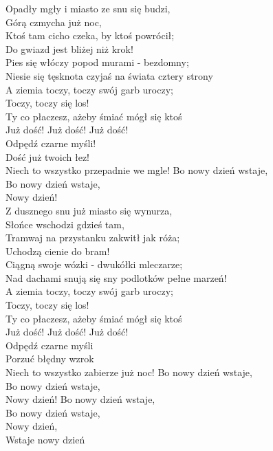 
Opadły mgły i miasto ze snu się budzi, \\
Górą czmycha już noc, \tab{} \\
Ktoś tam cicho czeka, by ktoś powrócił; \\
Do gwiazd jest bliżej niż krok! \\
Pies się włóczy popod murami - bezdomny; \\
Niesie się tęsknota czyjaś na świata cztery strony \\
\hops
{} A ziemia toczy, toczy swój garb uroczy; \\
 Toczy, toczy się los! \\
 Ty co płaczesz, ażeby śmiać mógł się ktoś \\
 Już dość! Już dość! Już dość! \\
 Odpędź czarne myśli! \\
 Dość już twoich łez! \\
 Niech to wszystko przepadnie we mgle! 
\hop
{} {} Bo nowy dzień wstaje, \\
 {} Bo nowy dzień wstaje, \\
 {} Nowy dzień! \\
\hops
Z dusznego snu już miasto się wynurza, \\
Słońce wschodzi gdzieś tam, \\
Tramwaj na przystanku zakwitł jak róża; \\
Uchodzą cienie do bram! \\
Ciągną swoje wózki - dwukółki mleczarze; \\
Nad dachami snują się sny podlotków pełne marzeń! \\
\hops
{} A ziemia toczy, toczy swój garb uroczy; \\
 Toczy, toczy się los! \\
 Ty co płaczesz, ażeby śmiać mógł się ktoś \\
 Już dość! Już dość! Już dość! \\
 Odpędź czarne myśli \\
 Porzuć błędny wzrok \\
 Niech to wszystko zabierze już noc! 
\hop
{} {} Bo nowy dzień wstaje, \tab{$\mid$} \\
 {} Bo nowy dzień wstaje, \tab{$\mid$}\\
 {} Nowy dzień! \tab{}
\hop
{} {} Bo nowy dzień wstaje, \\
 {} Bo nowy dzień wstaje, \\
 {} Nowy dzień, \\
 {} Wstaje nowy dzień
